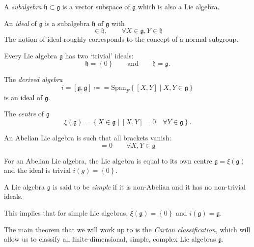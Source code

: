 \begin{definition}[subalgebra]
  A \emph{subalgebra} $\mathfrak{h} \subset \mathfrak{g}$ is a vector subspace of $\mathfrak{g}$ which is also a Lie algebra.
\end{definition}

\begin{definition}[ideal]
  An \emph{ideal} of $\mathfrak{g}$ is a subalgebra $\mathfrak{h}$ of $\mathfrak{g}$ with
  \begin{equation}
    [X, Y] \in \mathfrak{h}, \qquad \forall X \in \mathfrak{g}, Y \in \mathfrak{h}
  \end{equation}
  The notion of ideal roughly corresponds to the concept of a normal subgroup.
\end{definition}

\begin{example}
  Every Lie algebra $\mathfrak{g}$ has two `trivial' ideals:
  \begin{equation}
    \mathfrak{h} = \left\{ 0 \right\} \qquad \text{and} \qquad \mathfrak{h} = \mathfrak{g}.
  \end{equation}
\end{example}
\begin{example}
  The \emph{derived algebra}
  \begin{equation}
    i = [\mathfrak{g}, \mathfrak{g}] \coloneq = \text{Span}_F \left\{ [X, Y] \mid X, Y \in \mathfrak{g} \right\}
  \end{equation}
  is an ideal of $\mathfrak{g}$.
\end{example}
\begin{example}[centre]
  The \emph{centre} of $\mathfrak{g}$
  \begin{equation}
    \xi(\mathfrak{g}) = \left\{ X \in \mathfrak{g} \mid [X, Y] = 0 \quad \forall Y \in \mathfrak{g} \right\}.
  \end{equation}
\end{example}

\begin{definition}[abelian]
  An Abelian Lie algebra is such that all brackets vanish:
  \begin{equation}
    [X, Y] = 0 \qquad \forall X, Y \in \mathfrak{g}
  \end{equation}
\end{definition}

For an Abelian Lie algebra, the Lie algebra is equal to its own centre $\mathfrak{g} = \xi(\mathfrak{g})$ and the ideal is trivial $i(g) = \left\{ 0 \right\}$.

\begin{definition}[simple]
  A Lie algebra $\mathfrak{g}$ is said to be \emph{simple} if it is non-Abelian and it has no non-trivial ideals.
\end{definition}
This implies that for simple Lie algebras, $\xi(\mathfrak{g}) = \left\{ 0 \right\}$ and $i(\mathfrak{g}) = \mathfrak{g}$.

The main theorem that we will work up to is the \emph{Cartan classification}, which will allow us to classify all finite-dimensional, simple, complex Lie algebras $\mathfrak{g}$.
